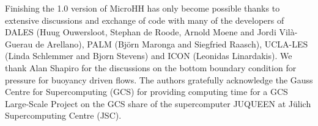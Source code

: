 \documentclass[gmd,manuscript]{copernicus}
\begin{document}
\begin{acknowledgements}
Finishing the 1.0 version of MicroHH has only become possible thanks to extensive discussions and exchange of code with many of the developers of DALES (Huug Ouwersloot, Stephan de Roode, Arnold Moene and Jordi Vil\`{a}-Guerau de Arellano), PALM (Bj\"{o}rn Maronga and Siegfried Raasch), UCLA-LES (Linda Schlemmer and Bjorn Stevens) and ICON (Leonidas Linardakis). We thank Alan Shapiro for the discussions on the bottom boundary condition for pressure for buoyancy driven flows. The authors gratefully acknowledge the Gauss Centre for Supercomputing (GCS) for providing computing time for a GCS Large-Scale Project on the GCS share of the supercomputer JUQUEEN at Jülich Supercomputing Centre (JSC). 
\end{acknowledgements}


%

\end{document}

